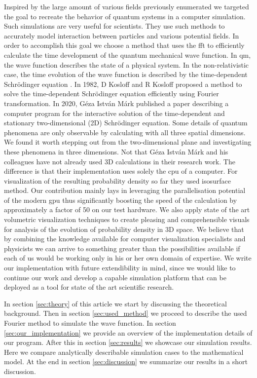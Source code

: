 Inspired by the large amount of various fields previously enumerated we targeted the goal to recreate the behavior of quantum systems in a computer simulation.
Such simulations are very useful for scientists. They use such methods to accurately model interaction between particles and various potential fields.
In order to accomplish this goal we choose a method that uses the \acrfull{fft} to efficiently calculate the time development of the quantum mechanical wave function.
In \acrshort{qm}, the wave function describes the state of a physical system. In the non-relativistic case, the time evolution of the wave function is described by the time-dependent Schrödinger equation \cite{schrodinger1926}.
In 1982, D Kosloff and R Kosloff proposed a method \cite{KOSLOFF198335} to solve the time-dependent Schrödinger equation efficiently using Fourier transformation.
In 2020, Géza István Márk published a paper \cite{mark2020webschrodinger} describing a computer program for the interactive solution of the time-dependent and stationary two-dimensional (2D) Schrödinger equation.
Some details of quantum phenomena are only observable by calculating with all three spatial dimensions.
We found it worth stepping out from the two-dimensional plane and investigating these phenomena in three dimensions.
Not that Géza István Márk and his colleagues have not already used 3D calculations in their research work.
The difference is that their implementation uses solely the \acrfull{cpu} of a computer.
For visualization of the resulting probability density so far they used isosurface method.
Our contribution mainly lays in leveraging the parallelisation potential of the modern \acrfull{gpu} thus significantly boosting the speed of the calculation by approximately a factor of 50 on our test hardware.
We also apply state of the art volumetric visualization techniques to create pleasing and comprehensible visuals for analysis of the evolution of probability density in 3D space.
We believe that by combining the knowledge available for computer visualization specialists and physicists we can arrive to something greater than the possibilities available if each of us would be working only in his or her own domain of expertise.
We write our implementation with future extendibility in mind, since we would like to continue our work and develop a capable simulation platform that can be deployed as a tool for state of the art scientific research.

In section \ref{sec:theory} of this article we start by discussing the theoretical background.
Then in section \ref{sec:used_method} we proceed to describe the used Fourier method to simulate the wave function.
In section \ref{sec:our_implementation} we provide an overview of the implementation details of our program.
After this in section \ref{sec:results} we showcase our simulation results.
Here we compare analytically describable simulation cases to the mathematical model.
At the end in section \ref{sec:discussion} we summarize our results in a short discussion.





